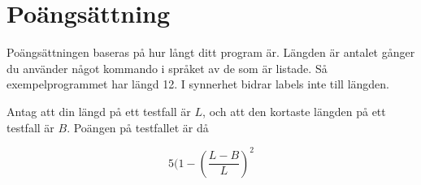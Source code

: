 \section*{Poängsättning}
Poängsättningen baseras på hur långt ditt program är. Längden är antalet gånger du använder något kommando i språket av de som är listade. Så exempelprogrammet har längd 12. I synnerhet bidrar labels inte till längden.

Antag att din längd på ett testfall är $L$, och att den kortaste längden på ett testfall är $B$. Poängen på testfallet är då

\[ 5 (1 - (\frac{L - B}{L})^2\]
